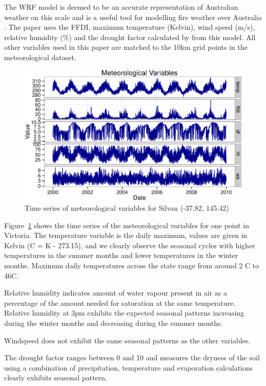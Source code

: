 \documentclass[11pt,a4paper]{article}
\begin{document}
The WRF model \citep{evans10} is deemed to be an accurate representation of Australian weather on this scale and is a useful tool for modelling fire weather over Australia \citep{clarke2013}. The paper uses the FFDI, maximum temperature (Kelvin), wind speed (m/s), relative humidity (\%) and the drought factor calculated by \citet{clarke2013}  from this model. All other variables used in this paper are matched to the 10km grid points in the meteorological dataset.

\begin{figure}
  \centering
  	\includegraphics[width=\textwidth]{figures/silvan.pdf}
  \caption{Time series of meteorological variables for Silvan (-37.82, 145.42)}
  \label{fig:silv}
\end{figure}

Figure~\ref{fig:silv} shows the time series of the meteorological variables for one point in Victoria. The temperature variable is the daily maximum, values are given in Kelvin (\degree C = K - 273.15), and we clearly observe the seasonal cycles with higher temperatures in the summer months and lower temperatures in the winter months. Maximum daily temperatures across the state range from around 2 \degree C to 46\degree  C.

Relative humidity indicates amount of water vapour present in air as a percentage of the amount needed for saturation at the same temperature. Relative humidity at 3pm exhibits the expected seasonal patterns increasing during the winter months and decreasing during the summer months.

Windspeed does not exhibit the same seasonal patterns as the other variables.

The drought factor ranges between 0 and 10 and measures the dryness of the soil using a combination of precipitation, temperature and evaporation calculations \citep{keetch68} clearly exhibits seasonal pattern.
\end{document}
